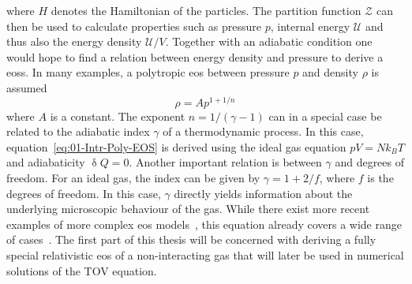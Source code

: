 where $H$ denotes the Hamiltonian of the particles.
The partition function $\mathcal{Z}$ can then be used to calculate properties such as pressure $p$, internal energy $\mathcal{U}$ and thus also the energy density $\mathcal{U}/V$.
Together with an adiabatic condition one would hope to find a relation between energy density and pressure to derive a \acp{eos}.
In many examples, a polytropic \ac{eos} between pressure $p$ and density $\rho$ is assumed
\begin{equation}
	\rho = Ap^{1+1/n}
	\label{eq:01-Intr-Poly-EOS}
\end{equation}
where $A$ is a constant.
The exponent $n=1/(\gamma-1)$ can in a special case be related to the adiabatic index $\gamma$ of a thermodynamic process.
In this case, equation~\ref{eq:01-Intr-Poly-EOS} is derived using the ideal gas equation $pV=Nk_B T$ and adiabaticity $\updelta Q=0$.
Another important relation is between $\gamma$ and degrees of freedom.
For an ideal gas, the index can be given by $\gamma=1+2/f$, where $f$ is the degrees of freedom.
In this case, $\gamma$ directly yields information about the underlying microscopic behaviour of the gas.
While there exist more recent examples of more complex \ac{eos} models~\cite{hummerEquationStateStellar1988}, this equation already covers a wide range of cases~\cite{horedtPolytropesApplicationsAstrophysics2004}.
The first part of this thesis will be concerned with deriving a fully special relativistic \ac{eos} of a non-interacting gas that will later be used in numerical solutions of the \ac{TOV} equation.